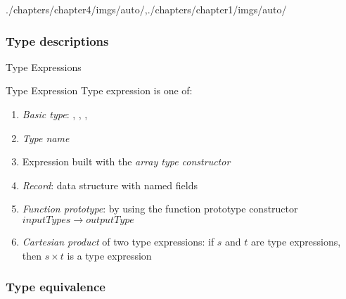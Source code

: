 \begin{graphicspathcontext}{{./chapters/chapter4/imgs/auto/},{./chapters/chapter1/imgs/auto/}}
\begin{bibunit}[apalike]
\subsubsection{Type descriptions}
\subsubsectiontableofcontentslide

\begin{frame}{Type Expressions}
	\vspace{.25cm}
	\begin{definitionblock}{Type Expression}
		Type expression is one of:
		\begin{enumerate}
		\item \emph{Basic type}: , , , 
		\item \emph{Type name}
		\item Expression built with the \emph{array type constructor}
		\item \emph{Record}: data structure with named fields
		\item \emph{Function prototype}: by using the function prototype constructor $inputTypes \rightarrow outputType$
		\item \emph{Cartesian product} of two type expressions: if $s$ and $t$ are type expressions, then $s \times t$ is a type expression
		\end{enumerate}
	\end{definitionblock}
\end{frame}

\subsubsection{Type equivalence}
\subsubsectiontableofcontentslide


\end{bibunit}
\end{graphicspathcontext}
